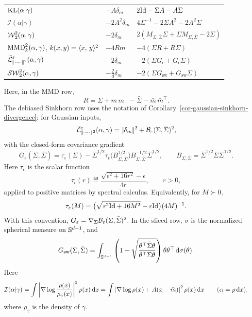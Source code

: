 \begin{prop}
\begin{center}
\begin{tabularx}{\linewidth}{>{\raggedright\arraybackslash}p{.42\linewidth}>{\centering\arraybackslash}p{.18\linewidth}>{\raggedright\arraybackslash}X}
			\(\operatorname{KL}(\alpha|\gamma)\)
			&
			\(-A\delta_m\)
			&
			\(2\mathrm{Id}-\Sigma A-A\Sigma\)
			\\
			\(\mathcal I(\alpha|\gamma)\)
			&
			\(-2A^2\delta_m\)
			&
			\(4\Sigma^{-1}-2\Sigma A^2-2A^2\Sigma\)
			\\
			\(\operatorname{\mathcal{W}}_2^2(\alpha,\gamma)\)
			&
			\(-2\delta_m\)
			&
			\(2(M_{\Sigma,\bar\Sigma}\Sigma+\Sigma M_{\Sigma,\bar\Sigma}-2\Sigma)\)
			\\
			\(\operatorname{MMD}_k^2(\alpha,\gamma)\), \(k(x,y)=\langle x,\,y\rangle^2\)
			&
			\(-4R m\)
			&
			\(-4(\Sigma R+R\Sigma)\)
			\\
			\(\displaystyle \bar{\mathcal{L}}_{|\!| \cdot-\cdot |\!|^2}^{\varepsilon}(\alpha,\gamma)\)
			&
			\(-2\delta_m\)
			&
			\(-2(\Sigma G_\epsilon+G_\epsilon\Sigma)\)
			\\
			\(\operatorname{\mathcal{SW}}_2^2(\alpha,\gamma)\)
			&
			\(\displaystyle -\frac{2}{d}\delta_m\)
			&
			\(-2(\Sigma G_{\mathrm{sw}}+G_{\mathrm{sw}}\Sigma)\)
			\\
			\hline
		\end{tabularx}
		\endgroup
		\end{center}
		Here, in the MMD row,
	\[
		R=\Sigma+m\,m^\top-\bar\Sigma-\bar m\,\bar m^\top.
	\]
	The debiased Sinkhorn row uses the notation of Corollary~\ref{cor-gaussian-sinkhorn-divergence}: for Gaussian inputs,
	\[
		\bar{\mathcal{L}}_{|\!| \cdot-\cdot |\!|^2}^{\varepsilon}(\alpha,\gamma)
		=
		|\!| \delta_m |\!|^2+\mathcal{B}_\varepsilon(\Sigma,\bar\Sigma)^2,
	\]
	with the closed-form covariance gradient
	\[
		G_\epsilon(\Sigma,\bar\Sigma)
		=
		\tau_\epsilon(\Sigma)
		-
		\bar\Sigma^{1/2}
		\tau_\epsilon\bigl(B_{\Sigma,\bar\Sigma}^{1/2}\bigr)
		B_{\Sigma,\bar\Sigma}^{-1/2}
		\bar\Sigma^{1/2},
		\qquad
		B_{\Sigma,\bar\Sigma}=\bar\Sigma^{1/2}\Sigma\bar\Sigma^{1/2}.
	\]
	Here \(\tau_\epsilon\) is the scalar function
	\[
		\tau_\epsilon(r)
		\eqdef
		\frac{\sqrt{\epsilon^2+16r^2}-\epsilon}{4r},
		\qquad r>0,
	\]
	applied to positive matrices by spectral calculus. Equivalently, for \(M\succ0\),
	\[
		\tau_\varepsilon(M)
		=
		\bigl(\sqrt{\varepsilon^2 \mathrm{Id}+16M^2}-\varepsilon \mathrm{Id}\bigr)(4M)^{-1}.
	\]
	With this convention, \(G_\varepsilon=\nabla_\Sigma \mathcal{B}_\varepsilon(\Sigma,\bar\Sigma)^2\).
	In the sliced row, \(\sigma\) is the normalized spherical measure on \(\mathbb{S}^{d-1}\), and
	\[
		G_{\mathrm{sw}}(\Sigma,\bar\Sigma)
		=
		\int_{\mathbb{S}^{d-1}}
		\left(
			1-\sqrt{\frac{\theta^\top\bar\Sigma\theta}{\theta^\top\Sigma\theta}}
		\right)
		\theta\theta^\top\,\mathrm{d}\sigma(\theta).
	\]
	Here
	\[
		\mathcal I(\alpha|\gamma)
		=
		\int \left|\nabla\log\frac{\rho(x)}{\rho_\gamma(x)}\right|^2\rho(x)\,\mathrm{d} x
		=
		\int
		\left|\nabla\log\rho(x)+A(x-\bar m)\right|^2\rho(x)\,\mathrm{d} x
		\qquad(\alpha=\rho\,\mathrm{d} x),
	\]
	where $\rho_\gamma$ is the density of $\gamma$.
\end{prop}

